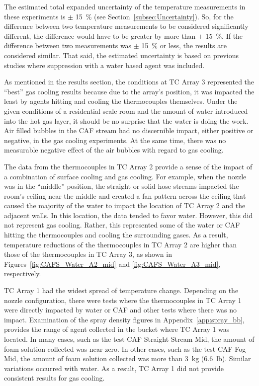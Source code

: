 \documentclass[12pt,oneside]{book}
\begin{document}
The estimated total expanded uncertainty of the temperature measurements in these experiments is $\pm$ 15~\% (see Section~\ref{subsec:Uncertainty}). So, for the difference between two temperature measurements to be considered significantly different, the difference would have to be greater by more than $\pm$ 15~\%. If the difference between two measurements was $\pm$ 15~\% or less, the results are considered similar. That said, the estimated uncertainty is based on previous studies where suppression with a water based agent was included.

As mentioned in the results section, the conditions at TC Array 3 represented the ``best'' gas cooling results because due to the array's position, it was impacted the least by agents hitting and cooling the thermocouples themselves. Under the given conditions of a residential scale room and the amount of water introduced into the hot gas layer, it should be no surprise that the water is doing the work. Air filled bubbles in the CAF stream had no discernible impact, either positive or negative, in the gas cooling experiments. At the same time, there was no measurable negative effect of the air bubbles with regard to gas cooling.

The data from the thermocouples in TC Array 2 provide a sense of the impact of a combination of surface cooling and gas cooling. For example, when the nozzle was in the ``middle'' position, the straight or solid hose streams impacted the room's ceiling near the middle and created a fan pattern across the ceiling that caused the majority of the water to impact the location of TC Array 2 and the adjacent walls. In this location, the data tended to favor water. However, this did not represent gas cooling. Rather, this represented some of the water or CAF hitting the thermocouples and cooling the surrounding gases. As a result, temperature reductions of the thermocouples in TC Array 2 are higher than those of the thermocouples in TC Array 3, as shown in Figures~\ref{fig:CAFS_Water_A2_mid} and \ref{fig:CAFS_Water_A3_mid}, respectively.

TC Array 1 had the widest spread of temperature change. Depending on the nozzle configuration, there were tests where the thermocouples in TC Array 1 were directly impacted by water or CAF and other tests where there was no impact. Examination of the spray density figures in Appendix~\ref{app:spray_bb}, provides the range of agent collected in the bucket where TC Array 1 was located. In many cases, such as the test CAF Straight Stream Mid, the amount of foam solution collected was near zero. In other cases, such as the test CAF Fog Mid, the amount of foam solution collected was more than 3~kg (6.6~lb). Similar variations occurred with water. As a result, TC Array 1 did not provide consistent results for gas cooling.  
\end{document}
